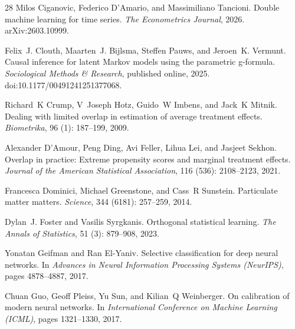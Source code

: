 \documentclass[twoside]{article}
\theoremstyle{definition}
\begin{document}
\begin{thebibliography}{28}
Milos Ciganovic, Federico D'Amario, and Massimiliano Tancioni.
\newblock Double machine learning for time series.
\newblock \emph{The Econometrics Journal}, 2026.
\newblock arXiv:2603.10999.

Felix~J. Clouth, Maarten~J. Bijlsma, Steffen Pauws, and Jeroen~K. Vermunt.
\newblock Causal inference for latent Markov models using the parametric g-formula.
\newblock \emph{Sociological Methods \& Research}, published online, 2025.
\newblock doi:10.1177/00491241251377068.

Richard~K Crump, V~Joseph Hotz, Guido~W Imbens, and Jack~K Mitnik.
\newblock Dealing with limited overlap in estimation of average treatment effects.
\newblock \emph{Biometrika}, 96 (1): 187--199, 2009.

Alexander D'Amour, Peng Ding, Avi Feller, Lihua Lei, and Jasjeet Sekhon.
\newblock Overlap in practice: Extreme propensity scores and marginal treatment effects.
\newblock \emph{Journal of the American Statistical Association}, 116 (536): 2108--2123, 2021.

Francesca Dominici, Michael Greenstone, and Cass~R Sunstein.
\newblock Particulate matter matters.
\newblock \emph{Science}, 344 (6181): 257--259, 2014.

Dylan~J. Foster and Vasilis Syrgkanis.
\newblock Orthogonal statistical learning.
\newblock \emph{The Annals of Statistics}, 51 (3): 879--908, 2023.

Yonatan Geifman and Ran El-Yaniv.
\newblock Selective classification for deep neural networks.
\newblock In \emph{Advances in Neural Information Processing Systems (NeurIPS)}, pages 4878--4887, 2017.

Chuan Guo, Geoff Pleiss, Yu Sun, and Kilian~Q Weinberger.
\newblock On calibration of modern neural networks.
\newblock In \emph{International Conference on Machine Learning (ICML)}, pages 1321--1330, 2017.


\end{thebibliography}
\end{document}
